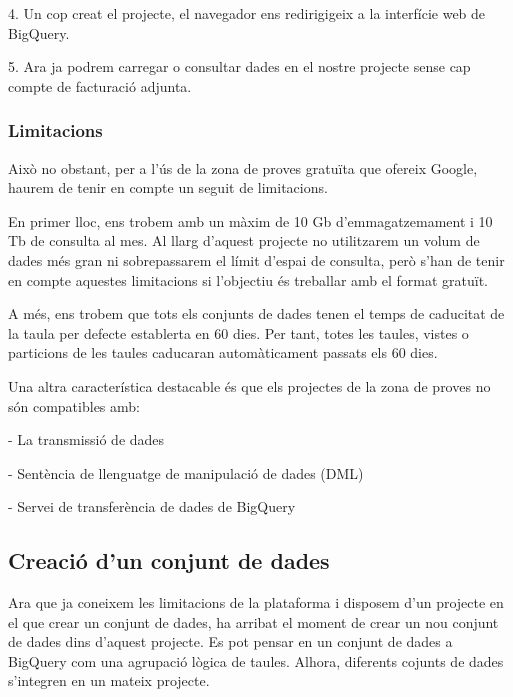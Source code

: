 \documentclass[12pt,longbibliography]{article}
\theoremstyle{definition}
\theoremstyle{remark}
\begin{document}
4. Un cop creat el projecte, el navegador ens redirigigeix a la interfície web de BigQuery.

\vspace{2mm}

5. Ara ja podrem carregar o consultar dades en el nostre projecte sense cap compte de facturació adjunta.

\subsubsection{Limitacions}

Això no obstant, per a l’ús de la zona de proves gratuïta que ofereix Google, haurem de tenir en compte un seguit de limitacions.

\vspace{2mm}

En primer lloc, ens trobem amb un màxim de 10 Gb d’emmagatzemament i 10 Tb de consulta al mes. Al llarg d’aquest projecte no utilitzarem un volum de dades més gran ni sobrepassarem el límit d’espai de consulta, però s’han de tenir en compte aquestes limitacions si l’objectiu és treballar amb el format gratuït.

\vspace{2mm}

A més, ens trobem que tots els conjunts de dades tenen el temps de caducitat de la taula per defecte establerta en 60 dies. Per tant, totes les taules, vistes o particions de les taules caducaran automàticament passats els 60 dies.

\vspace{2mm}

Una altra característica destacable és que els projectes de la zona de proves no són compatibles amb:

- La transmissió de dades

- Sentència de llenguatge de manipulació de dades (DML)

- Servei de transferència de dades de BigQuery

\subsection{Creació d'un conjunt de dades}

Ara que ja coneixem les limitacions de la plataforma i disposem d'un projecte en el que crear un conjunt de dades, ha arribat el moment de crear un nou conjunt de dades dins d'aquest projecte. Es pot pensar en un conjunt de dades a BigQuery com una agrupació lògica de taules. Alhora, diferents cojunts de dades s'integren en un mateix projecte. 
\end{document}
